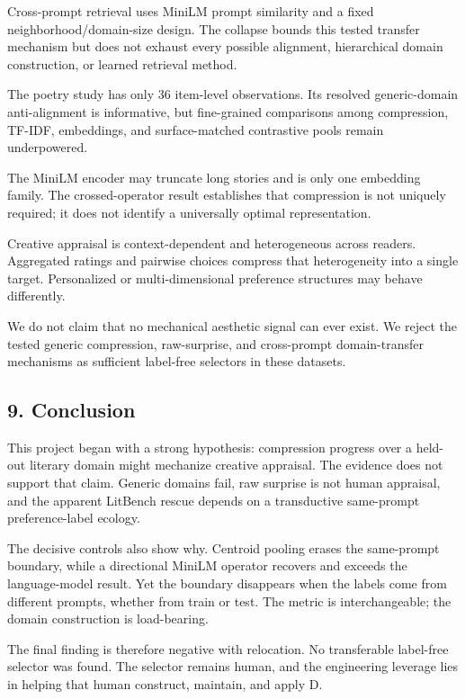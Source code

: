 \documentclass[
]{article}
\begin{document}
Cross-prompt retrieval uses MiniLM prompt similarity and a fixed
neighborhood/domain-size design. The collapse bounds this tested
transfer mechanism but does not exhaust every possible alignment,
hierarchical domain construction, or learned retrieval method.

The poetry study has only 36 item-level observations. Its resolved
generic-domain anti-alignment is informative, but fine-grained
comparisons among compression, TF-IDF, embeddings, and surface-matched
contrastive pools remain underpowered.

The MiniLM encoder may truncate long stories and is only one embedding
family. The crossed-operator result establishes that compression is not
uniquely required; it does not identify a universally optimal
representation.

Creative appraisal is context-dependent and heterogeneous across
readers. Aggregated ratings and pairwise choices compress that
heterogeneity into a single target. Personalized or multi-dimensional
preference structures may behave differently.

We do not claim that no mechanical aesthetic signal can ever exist. We
reject the tested generic compression, raw-surprise, and cross-prompt
domain-transfer mechanisms as sufficient label-free selectors in these
datasets.

\subsection{9. Conclusion}\label{conclusion}

This project began with a strong hypothesis: compression progress over a
held-out literary domain might mechanize creative appraisal. The
evidence does not support that claim. Generic domains fail, raw surprise
is not human appraisal, and the apparent LitBench rescue depends on a
transductive same-prompt preference-label ecology.

The decisive controls also show why. Centroid pooling erases the
same-prompt boundary, while a directional MiniLM operator recovers and
exceeds the language-model result. Yet the boundary disappears when the
labels come from different prompts, whether from train or test. The
metric is interchangeable; the domain construction is load-bearing.

The final finding is therefore negative with relocation. No transferable
label-free selector was found. The selector remains human, and the
engineering leverage lies in helping that human construct, maintain, and
apply D.
\end{document}
